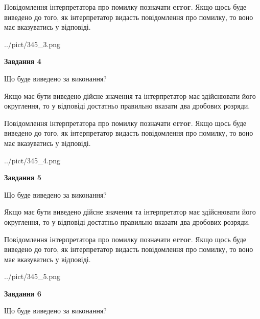 \documentclass[12pt, ukrainian]{article}
\begin{document}
{\begin {Large}
Повідомлення інтерпретатора про помилку позначати \textbf{error}.
Якщо щось буде виведено до того, як інтерпретатор видасть повідомлення про помилку, 
то воно має вказуватись у відповіді. \par

\begin{center}
	{../pict/345_3.png}
\end{center}
\newpage

{\begin {center}\textbf{Завдання 4}\end {center}}\par
Що буде виведено за виконання? \par

Якщо має бути виведено дійсне значення та інтерпретатор має здійснювати його округлення, 
то у відповіді достатньо правильно вказати два дробових розряди.

Повідомлення інтерпретатора про помилку позначати \textbf{error}.
Якщо щось буде виведено до того, як інтерпретатор видасть повідомлення про помилку, 
то воно має вказуватись у відповіді. \par

\begin{center}
	{../pict/345_4.png}
\end{center}
\newpage

{\begin {center}\textbf{Завдання 5}\end {center}}\par
Що буде виведено за виконання? \par

Якщо має бути виведено дійсне значення та інтерпретатор має здійснювати його округлення, 
то у відповіді достатньо правильно вказати два дробових розряди.

Повідомлення інтерпретатора про помилку позначати \textbf{error}.
Якщо щось буде виведено до того, як інтерпретатор видасть повідомлення про помилку, 
то воно має вказуватись у відповіді. \par

\begin{center}
	{../pict/345_5.png}
\end{center}
\newpage

{\begin {center}\textbf{Завдання 6}\end {center}}\par
Що буде виведено за виконання? \par


\end{Large}}
\end{document}
